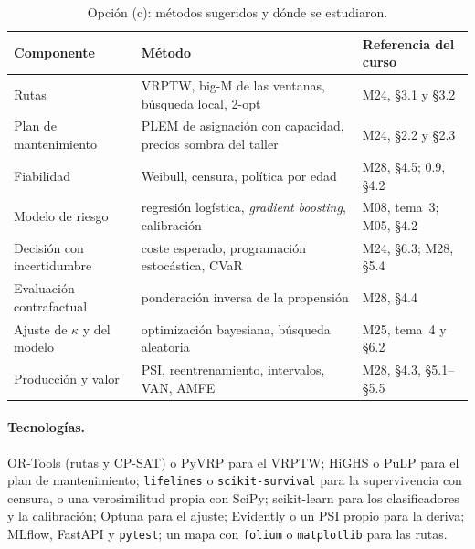 \begin{table}[H]
\centering\small
\caption{Opción (c): métodos sugeridos y dónde se estudiaron.}\label{tab:metodos-c}
\begin{tabularx}{\textwidth}{@{}>{\raggedright\arraybackslash}p{3.6cm}>{\raggedright\arraybackslash}X>{\raggedright\arraybackslash}p{3.8cm}@{}}
\toprule
Componente & Método & Referencia del curso \\
\midrule
Rutas & VRPTW, big-M de las ventanas, búsqueda local, 2-opt & M24, §3.1 y §3.2 \\
Plan de mantenimiento & PLEM de asignación con capacidad, precios sombra del taller & M24, §2.2 y §2.3 \\
Fiabilidad & Weibull, censura, política por edad & M28, §4.5; 0.9, §4.2 \\
Modelo de riesgo & regresión logística, \emph{gradient boosting}, calibración & M08, tema~3; M05, §4.2 \\
Decisión con incertidumbre & coste esperado, programación estocástica, CVaR & M24, §6.3; M28, §5.4 \\
Evaluación contrafactual & ponderación inversa de la propensión & M28, §4.4 \\
Ajuste de $\kappa$ y del modelo & optimización bayesiana, búsqueda aleatoria & M25, tema~4 y §6.2 \\
Producción y valor & PSI, reentrenamiento, intervalos, VAN, AMFE & M28, §4.3, §5.1--§5.5 \\
\bottomrule
\end{tabularx}
\end{table}

\paragraph{Tecnologías.} OR-Tools (rutas y CP-SAT) o PyVRP para el VRPTW; HiGHS o PuLP para el plan de mantenimiento; \texttt{lifelines} o \texttt{scikit-survival} para la supervivencia con censura, o una verosimilitud propia con SciPy; scikit-learn para los clasificadores y la calibración; Optuna para el ajuste; Evidently o un PSI propio para la deriva; MLflow, FastAPI y \texttt{pytest}; un mapa con \texttt{folium} o \texttt{matplotlib} para las rutas.

